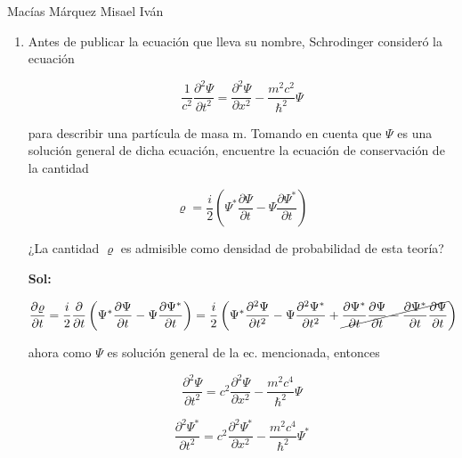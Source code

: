 \documentclass[12pt,a4paper]{article}
\begin{document}
Macías Márquez Misael Iván

\begin{enumerate}





    \item Antes de publicar la ecuación que lleva su nombre, Schrodinger consideró la ecuación
    
    \begin{equation*}
        \frac{1}{c^2} \frac{\partial^2 \Psi}{\partial t^2} = \frac{\partial^2 \Psi}{\partial x ^2} - \frac{m^2 c^2}{\hbar^2} \Psi
    \end{equation*}
    
    para describir una partícula de masa m. Tomando en cuenta que $\Psi$ es una solución general de dicha ecuación, encuentre la ecuación de conservación de la cantidad
    
    \begin{equation*}
        \varrho = \frac{i}{2} \left(\Psi^* \frac{\partial \Psi}{\partial t} - \Psi \frac{\partial \Psi ^*}{\partial t}\right)
    \end{equation*}
    
    ¿La cantidad $\varrho$ es admisible como densidad de probabilidad de esta teoría? 
    
    \textbf{Sol:}
    
    \begin{equation*}
        \frac{\partial \varrho}{\partial t}  = \frac{i}{2} \frac{\partial}{\partial t} \left(\Psi^* \frac{\partial \Psi}{\partial t} - \Psi \frac{ \partial \Psi^*}{\partial t}\right) = \frac{i}{2}\left(\Psi^* \frac{\partial^2 \Psi}{\partial t^2} - \Psi \frac{\partial^2 \Psi^*}{\partial t^2} +\cancel{ \frac{\partial \Psi^*}{\partial t}\frac{\partial \Psi}{\partial t}- \frac{\partial \Psi^*}{\partial t}\frac{\partial \Psi}{\partial t}}\right)
    \end{equation*}
    
    ahora como $\Psi$ es solución general de la ec. mencionada, entonces
    
    \begin{equation*}
        \frac{\partial^2 \Psi}{\partial t^2} = c^2 \frac{\partial^2 \Psi}{\partial x^2} - \frac{m^2 c^4}{\hbar^2} \Psi
    \end{equation*}
    
    \begin{equation*}
        \frac{\partial^2 \Psi^*}{\partial t^2} = c^2 \frac{\partial^2 \Psi^*}{\partial x^2} - \frac{m^2 c^4}{\hbar^2} \Psi^*
    \end{equation*}
    

\end{enumerate}
\end{document}
